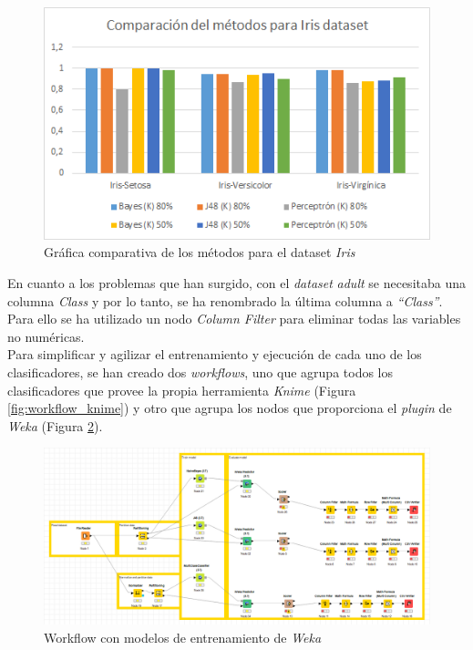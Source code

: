 \documentclass[10pt,a4paper]{article}
\begin{document}
\begin{figure}[h!]
	\centering
	\includegraphics[scale=0.9]{images/comparacionMetodos.png}
	\caption{Gráfica comparativa de los métodos para el dataset \emph{Iris}}
	\label{fig:graficaComparativa}
\end{figure}


En cuanto a los problemas que han surgido, con el \emph{dataset} \emph{adult} se necesitaba una columna \emph{Class} y por lo tanto, se ha renombrado la última columna a \emph{``Class''}. Para ello se ha utilizado un nodo \emph{Column Filter} para eliminar todas las variables no numéricas.\\

Para simplificar y agilizar el entrenamiento y ejecución de cada uno de los clasificadores, se han creado dos \textit{workflows}, uno que agrupa todos los clasificadores que provee la propia herramienta \textit{Knime} (Figura \ref{fig:workflow_knime}) y otro que agrupa los nodos que proporciona el \textit{plugin} de \textit{Weka} (Figura \ref{fig:workflow_weka}).

\begin{figure}[h!]
	\centering
	\includegraphics[scale=0.5]{images/workflow_ej3_weka.png}
	\caption{Workflow con modelos de entrenamiento de \textit{Weka}}
	\label{fig:workflow_weka}
\end{figure}
\end{document}
